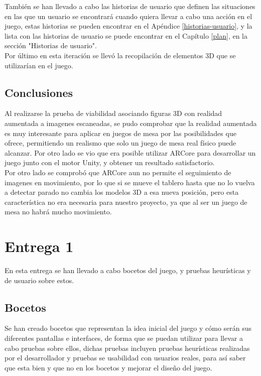 También se han llevado a cabo las historias de usuario que definen las situaciones en las que un usuario se encontrará cuando quiera llevar a cabo una acción en el juego, estas historias se pueden encontrar en el Apéndice \ref{historias-usuario}, y la lista con las historias de usuario se puede encontrar en el Capítulo \ref{plan}, en la sección "Historias de usuario".\\

Por último en esta iteración se llevó la recopilación de elementos 3D que se utilizarían en el juego.

\subsection{Conclusiones}
Al realizarse la prueba de viabilidad asociando figuras 3D con realidad aumentada a imagenes escaneadas, se pudo comprobar que la realidad aumentada es muy interesante para aplicar en juegos de mesa por las posibilidades que ofrece, permitiendo un realismo que solo un juego de mesa real físico puede alcanzar. Por otro lado se vio que era posible utilizar ARCore para desarrollar un juego junto con el motor Unity, y obtener un resultado satisfactorio.\\

Por otro lado se comprobó que ARCore aun no permite el seguimiento de imagenes en movimiento, por lo que si se mueve el tablero hasta que no lo vuelva a detectar parado no cambia los modelos 3D a esa nueva posición, pero esta característica no era necesaria para nuestro proyecto, ya que al ser un juego de mesa no habrá mucho movimiento.

\section{Entrega 1}
En esta entrega se han llevado a cabo bocetos del juego, y pruebas heurísticas y de usuario sobre estos.

\subsection{Bocetos}
Se han creado bocetos que representan la idea inicial del juego y cómo serán sus diferentes pantallas e interfaces, de forma que se puedan utilizar para llevar a cabo pruebas sobre ellos, dichas pruebas incluyen pruebas heurísticas realizadas por el desarrollador y pruebas se usabilidad con usuarios reales, para así saber que esta bien y que no en los bocetos y mejorar el diseño del juego.\\

